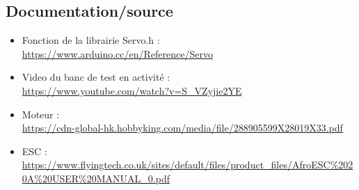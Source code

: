 \documentclass[10pt,a4paper]{article}
\begin{document}
 
\subsection{Documentation/source}
\begin{itemize}
 \item Fonction de la librairie Servo.h :\\
\url{https://www.arduino.cc/en/Reference/Servo}
\item Video du banc de test en activité : \\
\url{https://www.youtube.com/watch?v=S_VZyjie2YE}
\item Moteur : \\
\url{https://cdn-global-hk.hobbyking.com/media/file/288905599X28019X33.pdf}
\item ESC :\\
\url{https://www.flyingtech.co.uk/sites/default/files/product_files/AfroESC\%2020A\%20USER\%20MANUAL\_0.pdf}
\end{itemize}
\end{document}
